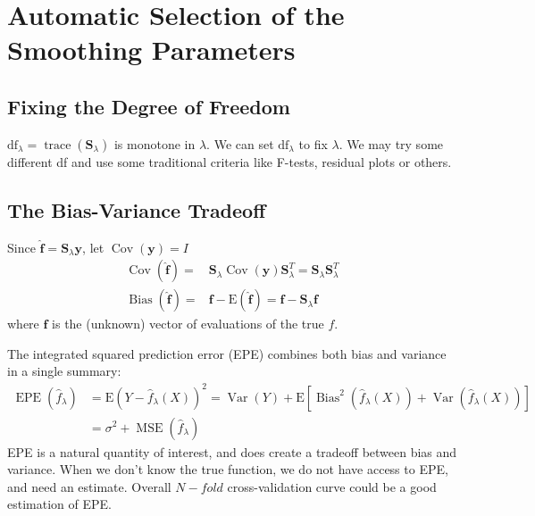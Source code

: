\section{Automatic Selection of the Smoothing Parameters}
\subsection{Fixing the Degree of Freedom}
$\mathrm{df}_{\lambda}=\operatorname{trace}\left(\mathbf{S}_{\lambda}\right)$ is monotone in 
$\lambda$. We can set $\mathrm{df}_{\lambda}$ to fix $\lambda$. We may try some different df 
and use some traditional criteria like F-tests, residual plots or others. 

\subsection{The Bias-Variance Tradeoff}
Since $\hat{\mathbf{f}}=\mathbf{S}_{\lambda} \mathbf{y}$, let $\operatorname{Cov}(\mathbf{y})=I$
\begin{align*}
\operatorname{Cov}(\hat{\mathbf{f}})=&\mathbf{S}_{\lambda}\operatorname{Cov}(\mathbf{y})
\mathbf{S}_{\lambda}^{T}=\mathbf{S}_{\lambda} \mathbf{S}_{\lambda}^{T}\\
\operatorname{Bias}(\hat{\mathbf{f}})=&\mathbf{f}-\mathrm{E}(\hat{\mathbf{f}})
=\mathbf{f}-\mathbf{S}_{\lambda} \mathbf{f}
\end{align*}
where $\mathbf{f}$ is the (unknown) vector of evaluations of the true $f$. 

The integrated squared prediction error (EPE) combines both bias and
variance in a single summary: 
\begin{align*} 
\operatorname{EPE}\left(\hat{f}_{\lambda}\right)&=\mathrm{E}\left(Y-\hat{f}_{\lambda}(X)\right)^{2}
=\operatorname{Var}(Y)+\mathrm{E}\left[\operatorname{Bias}^{2}\left(\hat{f}_{\lambda}(X)\right)
+\operatorname{Var}\left(\hat{f}_{\lambda}(X)\right)\right] \\ 
&=\sigma^{2}+\operatorname{MSE}\left(\hat{f}_{\lambda}\right) 
\end{align*}
EPE is a natural quantity of interest, and does create a tradeoff between bias and variance.
When we don’t know the true function, we do not have access to EPE, and need an estimate. Overall
$N-fold$ cross-validation curve could be a good estimation of EPE. 

